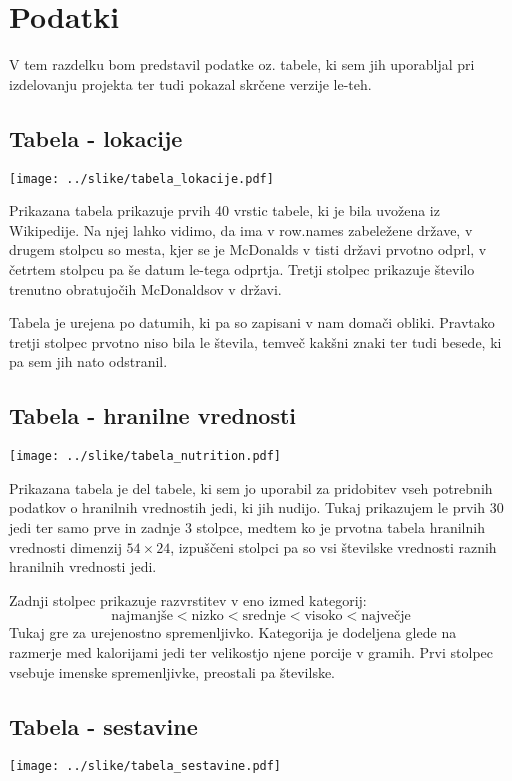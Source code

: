 \documentclass[11pt,a4paper]{article}
\begin{document}
\newpage

\section{Podatki}

V tem razdelku bom predstavil podatke oz. tabele, ki sem jih uporabljal pri izdelovanju projekta ter tudi pokazal skrčene verzije le-teh.

\subsection{Tabela - lokacije}
\texttt{[image: ../slike/tabela\_lokacije.pdf]}

Prikazana tabela prikazuje prvih 40 vrstic tabele, ki je bila uvožena iz Wikipedije. Na njej lahko vidimo, da ima v row.names zabeležene države, v drugem stolpcu so mesta, kjer se
je McDonalds v tisti državi prvotno odprl, v četrtem stolpcu pa še datum le-tega odprtja. Tretji stolpec prikazuje število trenutno obratujočih McDonaldsov v državi. \par

Tabela je urejena po datumih, ki pa so zapisani v nam domači obliki. Pravtako tretji stolpec prvotno niso bila le števila, temveč kakšni znaki ter tudi besede, ki pa sem jih nato odstranil.

\subsection{Tabela - hranilne vrednosti}
\texttt{[image: ../slike/tabela\_nutrition.pdf]}

Prikazana tabela je del tabele, ki sem jo uporabil za pridobitev vseh potrebnih podatkov o hranilnih vrednostih jedi, ki jih nudijo. Tukaj prikazujem le prvih 30 jedi ter samo prve in zadnje 3 stolpce, medtem ko je prvotna tabela hranilnih vrednosti dimenzij $54\times24$, izpuščeni stolpci pa so vsi številske vrednosti raznih hranilnih vrednosti jedi. \par

Zadnji stolpec prikazuje razvrstitev v eno izmed kategorij: $$\mbox{najmanjše} < \mbox{nizko} < \mbox{srednje} < \mbox{visoko} < \mbox{največje}$$
Tukaj gre za urejenostno spremenljivko. Kategorija je dodeljena glede na razmerje med kalorijami jedi ter velikostjo njene porcije v gramih.
Prvi stolpec vsebuje imenske spremenljivke, preostali pa številske.

\subsection{Tabela - sestavine}
\texttt{[image: ../slike/tabela\_sestavine.pdf]}
\end{document}
